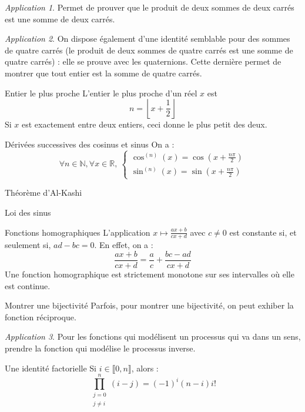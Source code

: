 \documentclass[french]{book}
\newcommand{\N}{\mathbb{N}}
\newcommand{\R}{\mathbb{R}}
\theoremstyle{plain}
\theoremstyle{definition}
\theoremstyle{remark}
\newtheorem*{app}{Application}
\begin{document}
\begin{app}
	Permet de prouver que le produit de deux sommes de deux carrés est une somme de deux carrés.
\end{app}

\begin{app}
	On dispose également d'une identité semblable pour des sommes de quatre carrés (le produit de deux sommes de quatre carrés est une somme de quatre carrés) : elle se prouve avec les quaternions. Cette dernière permet de montrer que tout entier est la somme de quatre carrés.
\end{app}

\begin{AS}{Entier le plus proche} L'entier le plus proche d'un réel $x$ est $$n=\left\lfloor x+\frac{1}{2}\right\rfloor$$ Si $x$ est exactement entre deux entiers, ceci donne le plus petit des deux.
\end{AS}

\begin{AS}{Dérivées successives des cosinus et sinus} On a : $$\forall n\in\N, \forall x\in\R,\ \begin{cases}
	\cos^{(n)}(x)=\cos\left(x+\frac{n\pi}{2}\right) \\
	\sin^{(n)}(x)=\sin\left(x+\frac{n\pi}{2}\right)
\end{cases}$$
\end{AS}

\begin{AS}{Théorème d'Al-Kashi}
\end{AS}

\begin{AS}{Loi des sinus}
\end{AS}

\begin{AS}{Fonctions homographiques} L'application $x\mapsto\displaystyle\frac{ax+b}{cx+d}$ avec $c\ne0$ est constante si, et seulement si, $ad-bc=0$. En effet, on a : $$\frac{ax+b}{cx+d}=\frac{a}{c}+\frac{bc-ad}{cx+d}$$ Une fonction homographique est strictement monotone sur ses intervalles où elle est continue.
\end{AS}
\begin{AS}{Montrer une bijectivité} Parfois, pour montrer une bijectivité, on peut exhiber la fonction réciproque.
\end{AS}
\begin{app}
	Pour les fonctions qui modélisent un processus qui va dans un sens, prendre la fonction qui modélise le processus inverse.
\end{app}
\begin{AS}{Une identité factorielle} Si $i\in\llbracket0,n\rrbracket$, alors : $$\prod_{\substack{j=0\\ j\ne i}}^{n}(i-j)=(-1)^i(n-i)i!$$
\end{AS}
\end{document}
